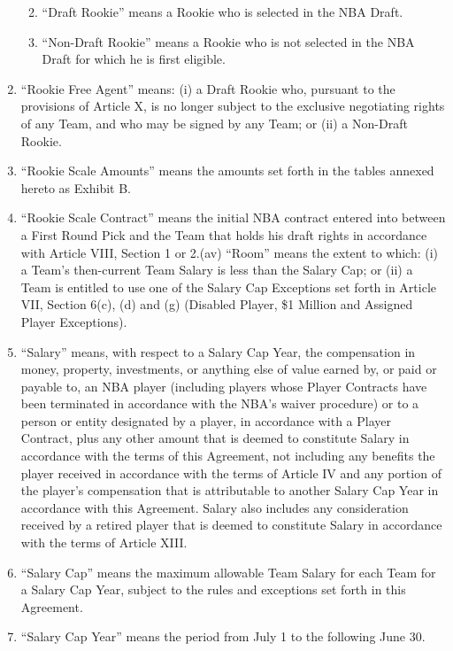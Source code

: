 \documentclass[
]{book}
\providecommand{\tightlist}{%
  \setlength{\itemsep}{0pt}\setlength{\parskip}{0pt}}
\begin{document}
\begin{enumerate}
  \begin{enumerate}
  \def\labelenumii{\arabic{enumii}.}
  \tightlist
  \item
    ``Draft Rookie'' means a Rookie who is selected in the NBA Draft.
  \item
    ``Non-Draft Rookie'' means a Rookie who is not selected in the NBA Draft for which he is first eligible.
  \end{enumerate}
\item
  ``Rookie Free Agent'' means: (i) a Draft Rookie who, pursuant to the provisions of Article X, is no longer subject to the exclusive negotiating rights of any Team, and who may be signed by any Team; or (ii) a Non-Draft Rookie.
\item
  ``Rookie Scale Amounts'' means the amounts set forth in the tables annexed hereto as Exhibit B.
\item
  ``Rookie Scale Contract'' means the initial NBA contract entered into between a First Round Pick and the Team that holds his draft rights in accordance with Article VIII, Section 1 or 2.(av) ``Room'' means the extent to which: (i) a Team's then-current Team Salary is less than the Salary Cap; or (ii) a Team is entitled to use one of the Salary Cap Exceptions set forth in Article VII, Section 6(c), (d) and (g) (Disabled Player, \$1 Million and Assigned Player Exceptions).
\item
  ``Salary'' means, with respect to a Salary Cap Year, the compensation in money, property, investments, or anything else of value earned by, or paid or payable to, an NBA player (including players whose Player Contracts have been terminated in accordance with the NBA's waiver procedure) or to a person or entity designated by a player, in accordance with a Player Contract, plus any other amount that is deemed to constitute Salary in accordance with the terms of this Agreement, not including any benefits the player received in accordance with the terms of Article IV and any portion of the player's compensation that is attributable to another Salary Cap Year in accordance with this Agreement. Salary also includes any consideration received by a retired player that is deemed to constitute Salary in accordance with the terms of Article XIII.
\item
  ``Salary Cap'' means the maximum allowable Team Salary for each Team for a Salary Cap Year, subject to the rules and exceptions set forth in this Agreement.
\item
  ``Salary Cap Year'' means the period from July 1 to the following June 30.

\end{enumerate}
\end{document}
